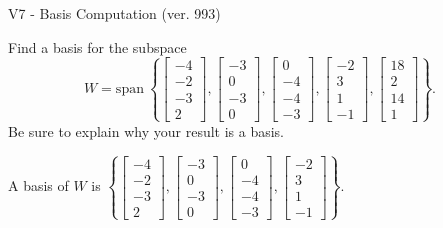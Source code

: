 \begin{exercise}
  \begin{exerciseTitle}V7 - Basis Computation (ver. 993)\end{exerciseTitle}
  \begin{exerciseStatement}
    Find a basis for the subspace 
\[W=\mathrm{span}\ \left\{\left[\begin{array}{r}
-4 \\
-2 \\
-3 \\
2
\end{array}\right] , \left[\begin{array}{r}
-3 \\
0 \\
-3 \\
0
\end{array}\right] , \left[\begin{array}{r}
0 \\
-4 \\
-4 \\
-3
\end{array}\right] , \left[\begin{array}{r}
-2 \\
3 \\
1 \\
-1
\end{array}\right] , \left[\begin{array}{r}
18 \\
2 \\
14 \\
1
\end{array}\right]\right\}.\]
 Be sure to explain why your result is a basis.


  \end{exerciseStatement}
  \begin{exerciseAnswer}
   A basis of \(W\) is  \(\left\{\left[\begin{array}{r}
-4 \\
-2 \\
-3 \\
2
\end{array}\right] , \left[\begin{array}{r}
-3 \\
0 \\
-3 \\
0
\end{array}\right] , \left[\begin{array}{r}
0 \\
-4 \\
-4 \\
-3
\end{array}\right] , \left[\begin{array}{r}
-2 \\
3 \\
1 \\
-1
\end{array}\right]\right\}\).
  


  \end{exerciseAnswer}
\end{exercise}